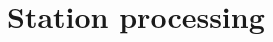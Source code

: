 \documentclass[journal]{IEEEtran}
\begin{document}
%
%


%



\section{Station processing}
\end{document}
